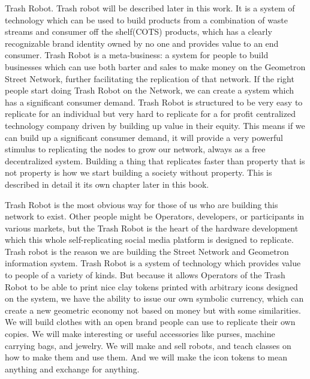 Trash Robot.  Trash robot will be described later in this work.  It is a system of technology which can be used to build products from a combination of waste streams and consumer off the shelf(COTS) products, which has a clearly recognizable brand identity owned by no one and provides value to an end consumer.  Trash Robot is a meta-business: a system for people to build businesses which can use both barter and sales to make money on the Geometron Street Network, further facilitating the replication of that network. If the right people start doing Trash Robot on the Network, we can create a system which has a significant consumer demand.  Trash Robot is structured to be very easy to replicate for an individual but very hard to replicate for a for profit centralized technology company driven by building up value in their equity.  This means if we can build up a significant consumer demand, it will provide a very powerful stimulus to replicating the nodes to grow our network, always as a free decentralized system.  Building a thing that replicates faster than property that is not property is how we start building a society without property.  This is described in detail it its own chapter later in this book.

Trash Robot is the most obvious way for those of us who are building this network to exist.  Other people might be Operators, developers, or participants in various markets, but the Trash Robot is the heart of the hardware development which this whole self-replicating social media platform is designed to replicate.  Trash robot is the reason we are building the Street Network and Geometron information system.  Trash Robot is a system of technology which provides value to people of a variety of kinds.  But because it allows Operators of the Trash Robot to be able to print nice clay tokens printed with arbitrary icons designed on the system, we have the ability to issue our own symbolic currency, which can create a new geometric economy not based on money but with some similarities.  We will build clothes with an open brand people can use to replicate their own copies.  We will make interesting or useful accessories like purses, machine carrying bags, and jewelry. We will make and sell robots, and teach classes on how to make them and use them.  And we will make the icon tokens to mean anything and exchange for anything. 


